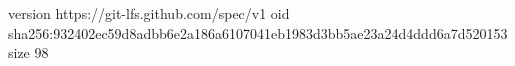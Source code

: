 version https://git-lfs.github.com/spec/v1
oid sha256:932402ec59d8adbb6e2a186a6107041eb1983d3bb5ae23a24d4ddd6a7d520153
size 98
